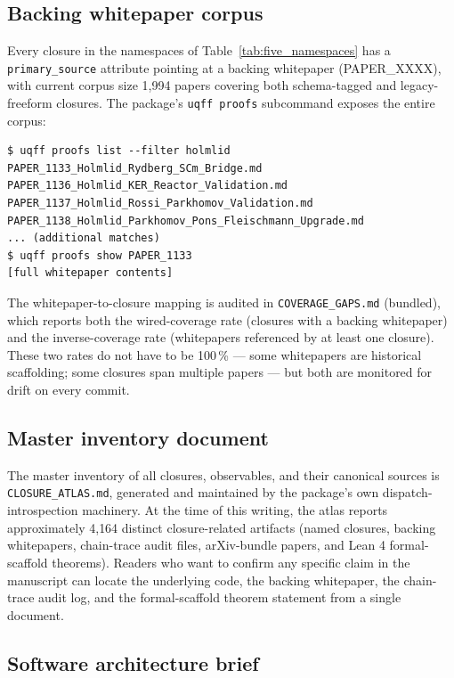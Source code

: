 \subsection{Backing whitepaper corpus}
\label{sec:whitepaper_corpus}

Every closure in the namespaces of Table~\ref{tab:five_namespaces}
has a \texttt{primary\_source} attribute pointing at a backing
whitepaper (PAPER\_XXXX), with current corpus size 1,994 papers
covering both schema-tagged and legacy-freeform closures. The
package's \texttt{uqff proofs} subcommand exposes the entire corpus:

\begin{verbatim}
$ uqff proofs list --filter holmlid
PAPER_1133_Holmlid_Rydberg_SCm_Bridge.md
PAPER_1136_Holmlid_KER_Reactor_Validation.md
PAPER_1137_Holmlid_Rossi_Parkhomov_Validation.md
PAPER_1138_Holmlid_Parkhomov_Pons_Fleischmann_Upgrade.md
... (additional matches)
$ uqff proofs show PAPER_1133
[full whitepaper contents]
\end{verbatim}

The whitepaper-to-closure mapping is audited in
\texttt{COVERAGE\_GAPS.md} (bundled), which reports both
the wired-coverage rate (closures with a backing whitepaper) and
the inverse-coverage rate (whitepapers referenced by at least one
closure). These two rates do not have to be 100\,\% --- some
whitepapers are historical scaffolding; some closures span multiple
papers --- but both are monitored for drift on every commit.

\subsection{Master inventory document}
\label{sec:master_inventory}

The master inventory of all closures, observables, and their
canonical sources is \texttt{CLOSURE\_ATLAS.md}, generated and
maintained by the package's own dispatch-introspection machinery.
At the time of this writing, the atlas reports approximately
4{,}164 distinct closure-related artifacts (named closures, backing
whitepapers, chain-trace audit files, arXiv-bundle papers, and
Lean 4 formal-scaffold theorems). Readers who want to confirm any
specific claim in the manuscript can locate the underlying code,
the backing whitepaper, the chain-trace audit log, and the
formal-scaffold theorem statement from a single document.

\subsection{Software architecture brief}
\label{sec:software_architecture}

